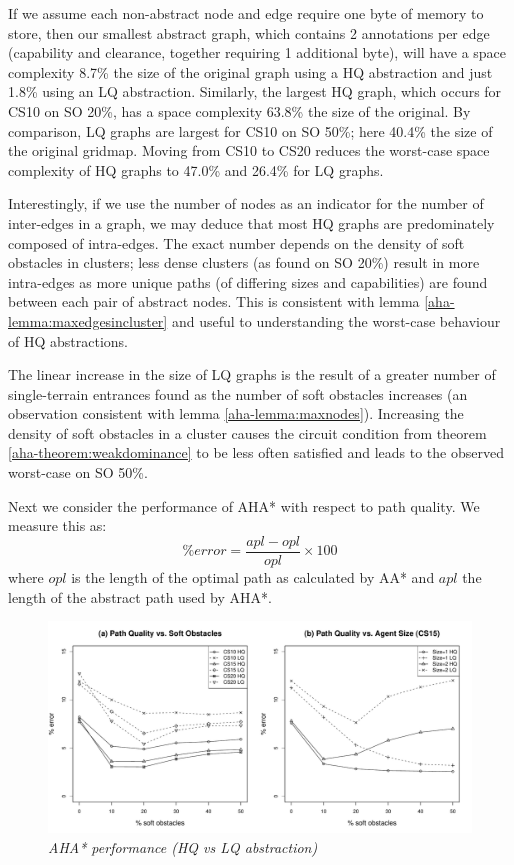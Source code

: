 If we assume each non-abstract node and edge require one byte of memory to store, then our smallest abstract graph, which contains 2 annotations per edge (capability and clearance, together requiring 1 additional byte), will have a space complexity 8.7\% the size of the original graph using a HQ abstraction and just 1.8\% using an LQ abstraction.
Similarly, the largest HQ graph, which occurs for CS10 on SO 20\%, has a space complexity 63.8\% the size of the original.
By comparison, LQ graphs are largest for CS10 on SO 50\%; here 40.4\% the size of the original gridmap.
Moving from CS10 to CS20 reduces the worst-case space complexity of HQ graphs to 47.0\% and 26.4\% for LQ graphs.
\par \indent
Interestingly, if we use the number of nodes as an indicator for the number of inter-edges in a graph, we may deduce that most HQ graphs are predominately composed of intra-edges. 
The exact number depends on the density of soft obstacles in clusters; less dense clusters (as found on SO 20\%) result in more intra-edges as more unique paths (of differing sizes and capabilities) are found between each pair of abstract nodes. 
This is consistent with lemma \ref{aha-lemma:maxedgesincluster} and useful to understanding the worst-case behaviour of HQ abstractions.
\par \indent
The linear increase in the size of LQ graphs is the result of a greater number of single-terrain entrances found as the number of soft obstacles increases (an observation consistent with lemma \ref{aha-lemma:maxnodes}).
Increasing the density of soft obstacles in a cluster causes the circuit condition from theorem \ref{aha-theorem:weakdominance} to be less often satisfied and leads to the observed worst-case on SO 50\%.
\par \indent
Next we consider the performance of AHA* with respect to path quality. We measure this as:
$$ \%error = \frac{apl - opl}{opl} \times 100 $$ where $opl$ is the length of the optimal path as calculated by AA* and $apl$ the length of the abstract path used by AHA*.
\begin{figure}[htbp]
	\vspace{-12pt}
	\caption{\small{\emph{AHA* performance (HQ vs LQ abstraction)}}}
	\begin{center}
		       \includegraphics[scale=0.25, trim = 20mm 17mm 20mm 5mm]{diagrams/pathquality.pdf}
	\end{center}
	\label{aha-fig:pathquality}
	\vspace{-5pt}
\end{figure}
